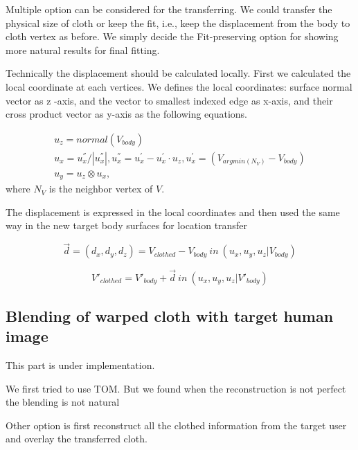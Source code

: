 Multiple option can be considered for the transferring. We could transfer the physical size of cloth or keep the fit, i.e., keep the displacement from the body to cloth vertex as before.  We simply decide the Fit-preserving option for showing more natural results for final fitting.  

Technically the displacement should be calculated locally. First we calculated the local coordinate at each vertices. We defines the local coordinates: surface normal vector as z -axis, and the vector to smallest indexed edge as x-axis, and their cross product vector as y-axis as the following equations.
 

\begin{align}
 u_{z} =  normal(V_{body})  \\
 u_{x} = u^{''}_{x}/ |u^{''}_{x} |, 
 u^{''}_{x} = u^{'}_{x} - u^{'}_{x} \cdot u_{z}, 
 u^{'}_{x} = (V_{argmin(N_V) } - V_{body}) \\
 u_{y}  =  u_z \otimes u_x,
\end{align} 
 where $N_V$ is the neighbor vertex of $V$.
 

The displacement is expressed in the local coordinates and then used the same way in the new target body surfaces for location transfer

\begin{equation}
\overrightarrow{d} = (d_x, d_y, d_z) = V_{clothed} - V_{body} \: in \: (u_x, u_y, u_z | V_{body})
\end{equation}


\begin{equation}
 V'_{clothed} = V'_{body} + \overrightarrow{d} \: in \: (u_x, u_y, u_z | V'_{body})
\end{equation}



\subsection{Blending of warped cloth with target human image}


This part is under implementation.

We first tried to use TOM. But we found when the reconstruction is not perfect the blending is not natural 

Other option is first reconstruct all the clothed information from the target user and overlay the transferred cloth.






